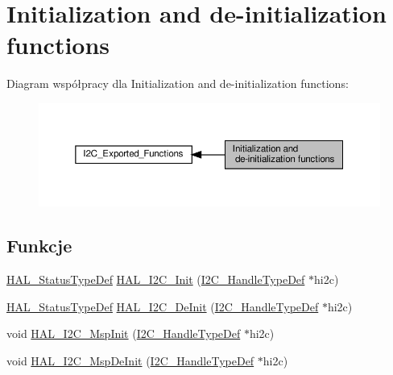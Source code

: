 \hypertarget{group___i2_c___exported___functions___group1}{}\section{Initialization and de-\/initialization functions}
\label{group___i2_c___exported___functions___group1}
Diagram współpracy dla Initialization and de-\/initialization functions\+:\nopagebreak
\begin{figure}[H]
\begin{center}
\leavevmode
\includegraphics[width=350pt]{group___i2_c___exported___functions___group1}
\end{center}
\end{figure}
\subsection*{Funkcje}
\begin{DoxyCompactItemize}
\item 
\hyperlink{stm32f4xx__hal__def_8h_a63c0679d1cb8b8c684fbb0632743478f}{H\+A\+L\+\_\+\+Status\+Type\+Def} \hyperlink{group___i2_c___exported___functions___group1_ga9d29159a6da072287fff73743fd93260}{H\+A\+L\+\_\+\+I2\+C\+\_\+\+Init} (\hyperlink{group___i2_c__handle___structure__definition_ga68e9f45c2fd2161fb827ccdeabb55ea5}{I2\+C\+\_\+\+Handle\+Type\+Def} $\ast$hi2c)
\item 
\hyperlink{stm32f4xx__hal__def_8h_a63c0679d1cb8b8c684fbb0632743478f}{H\+A\+L\+\_\+\+Status\+Type\+Def} \hyperlink{group___i2_c___exported___functions___group1_gabda634ba18f874775d1262c887d273b4}{H\+A\+L\+\_\+\+I2\+C\+\_\+\+De\+Init} (\hyperlink{group___i2_c__handle___structure__definition_ga68e9f45c2fd2161fb827ccdeabb55ea5}{I2\+C\+\_\+\+Handle\+Type\+Def} $\ast$hi2c)
\item 
void \hyperlink{group___i2_c___exported___functions___group1_gabe01a202c27b23fc150aa66af3130073}{H\+A\+L\+\_\+\+I2\+C\+\_\+\+Msp\+Init} (\hyperlink{group___i2_c__handle___structure__definition_ga68e9f45c2fd2161fb827ccdeabb55ea5}{I2\+C\+\_\+\+Handle\+Type\+Def} $\ast$hi2c)
\item 
void \hyperlink{group___i2_c___exported___functions___group1_ga2ec8d9b09854c732e2feed549278f048}{H\+A\+L\+\_\+\+I2\+C\+\_\+\+Msp\+De\+Init} (\hyperlink{group___i2_c__handle___structure__definition_ga68e9f45c2fd2161fb827ccdeabb55ea5}{I2\+C\+\_\+\+Handle\+Type\+Def} $\ast$hi2c)
\end{DoxyCompactItemize}



